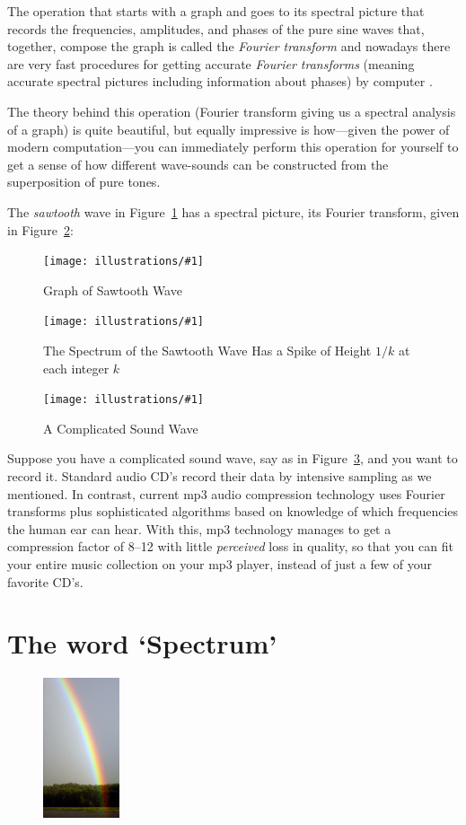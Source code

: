\documentclass[openany]{book}
\newcommand{\ill}[3]{%
   \begin{figure}[H]%
   \vspace{-2ex}
   \centering%
   \texttt{[image: illustrations/\#1]}%
   \caption{#3}%
   \vspace{-2ex}
    \end{figure}}
\theoremstyle{plain}
\theoremstyle{definition}
\begin{document}
The operation that starts with a graph and goes to its spectral
picture that records the frequencies, amplitudes, and phases of the
pure sine waves that, together, compose the graph is called the {\em
  Fourier transform} and nowadays there are very fast procedures for
getting accurate {\em Fourier transforms} (meaning accurate spectral
pictures including information about phases) by
computer .


The theory behind this operation (Fourier transform giving
us a spectral analysis of a graph) is quite beautiful, but equally
impressive is how---given the power of modern computation---you can
immediately perform this operation for yourself to get a sense of how
different wave-sounds can be constructed from the superposition of
pure tones.

The {\em sawtooth} wave in Figure~\ref{fig:sawtooth} has a spectral picture, its Fourier transform, given in Figure~\ref{fig:sawtooth-spectrum}:

   \ill{sawtooth}{.7}{Graph of Sawtooth Wave\label{fig:sawtooth}}
   \ill{sawtooth-spectrum}{.6}{The Spectrum of the Sawtooth Wave Has a Spike of Height $1/k$ at
each integer $k$\label{fig:sawtooth-spectrum}}



 \ill{complicated-wave}{.6}{A Complicated Sound Wave\label{fig:complicated-wave}}

Suppose you have a complicated sound wave, say as in
Figure~\ref{fig:complicated-wave}, and you want to record it.
Standard audio CD's record their data by intensive sampling as we
mentioned. In contrast, current mp3 audio compression technology uses
Fourier transforms plus sophisticated algorithms based on
knowledge of which frequencies the human ear can hear.
With this, mp3 technology manages to
get a compression factor of 8--12 with little {\em perceived} loss in
quality, so that you can fit your entire music collection on your
mp3 player, instead of just a few of your favorite CD's.

\chapter{ The word `Spectrum'}

\begin{figure}
    \includegraphics[width=0.2\textwidth]{illustrations/rainbow}
\end{figure}
\end{document}
